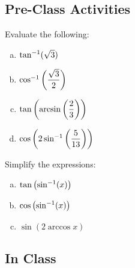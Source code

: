 \documentclass[notes]{subfiles}
\begin{document}
	\subsection*{Pre-Class Activities}
		\begin{ex}
			Evaluate the following:
			\begin{enumerate}[(a)]
				\item $\tan^{-1}(\sqrt{3})$
					
				\item $\cos^{-1}\left( \dfrac{\sqrt{3}}{2}\right)$
					
				\item $\tan\left( \arcsin\left( \dfrac{2}{3}\right)\right)$
					
				\item $\cos\left( 2\sin^{-1}\left( \dfrac{5}{13}\right)\right)$
			\end{enumerate}
		\end{ex}	
		
		\begin{ex}
			Simplify the expressions:
			\begin{enumerate}[(a)]
				\item $\tan \left( \sin^{-1}(x)\right)$
					\vs{1}
					
				\item $\cos\left( \sin^{-1}(x)\right)$
					\vs{1}
					
				\item $\sin (2\arccos x)$
					\vs{1}
			\end{enumerate}	
		\end{ex}
		\newpage
		
	\subsection*{In Class}
\end{document}
